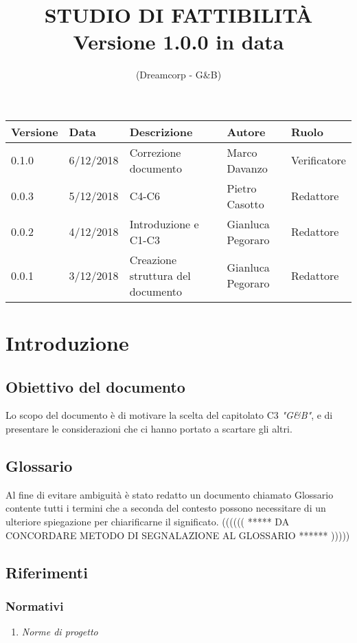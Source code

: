 \documentclass{article}
\title{\textbf{STUDIO DI FATTIBILITÀ}
\\{\Large Versione 1.0.0 in data }}
\author{(Dreamcorp - G\&B)}
\begin{document}
\maketitle
\newpage


\begin{tabularx}{\textwidth}{|X|X|X|X|X|}
    \hline
    \textbf{Versione} & \textbf{Data} & \textbf{Descrizione} & \textbf{Autore} & \textbf{Ruolo}\\
    \hline
    0.1.0 & 6/12/2018 & Correzione documento & Marco Davanzo & Verificatore \\
    \hline
    0.0.3 & 5/12/2018 & C4-C6 & Pietro Casotto & Redattore \\
    \hline
    0.0.2 & 4/12/2018 & Introduzione e C1-C3 & Gianluca Pegoraro & Redattore \\
    \hline
    0.0.1 & 3/12/2018 & Creazione struttura del documento & Gianluca Pegoraro & Redattore  \\
    \hline
\end{tabularx}


\newpage




\section{Introduzione}
    \subsection{Obiettivo del documento}
    Lo scopo del documento è di motivare la scelta del capitolato C3 \textit{"G\&B"}, e di presentare le    considerazioni che ci hanno portato a scartare gli altri.
    \subsection{Glossario}
        Al fine di evitare ambiguità è stato redatto un documento chiamato Glossario contente tutti i termini che a seconda del contesto possono necessitare di un ulteriore spiegazione per chiarificarne il   significato. ((((((  *****   DA CONCORDARE METODO DI SEGNALAZIONE AL GLOSSARIO ******   ))))) 
    \subsection{Riferimenti}
        \subsubsection{Normativi}
            \begin{enumerate}
                \item \textit{Norme di progetto}
            \end{enumerate}
\end{document}
